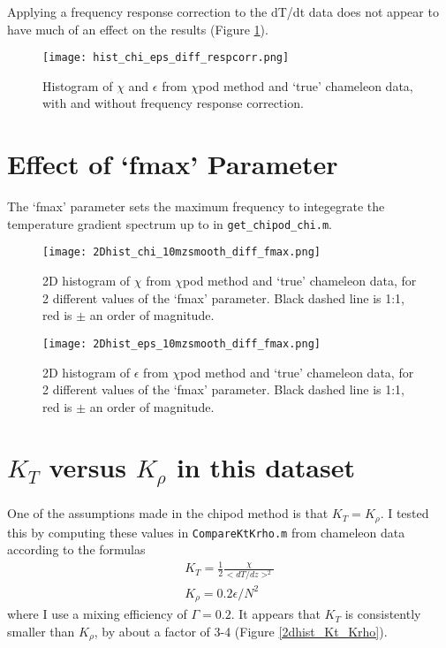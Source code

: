 \documentclass[11pt]{article}
\begin{document}
Applying a frequency response correction to the dT/dt data does not appear to have much of an effect on the results (Figure \ref{hist_dresp}).

\begin{figure}[htbp]
\texttt{[image: hist\_chi\_eps\_diff\_respcorr.png]}
\caption{Histogram of $\chi$ and $\epsilon$ from $\chi$pod method and `true' chameleon data, with and without frequency response correction.}
\label{hist_dresp}
\end{figure}






\clearpage
\newpage
\section{Effect of `fmax' Parameter}

The `fmax' parameter sets the maximum frequency to integegrate the temperature gradient spectrum up to in \verb+get_chipod_chi.m+.


\begin{figure}[htbp]
\texttt{[image: 2Dhist\_chi\_10mzsmooth\_diff\_fmax.png]}
\caption{2D histogram of $\chi$ from $\chi$pod method and `true' chameleon data, for 2 different values of the `fmax' parameter. Black dashed line is 1:1, red is $\pm$ an order of magnitude.}
\label{}
\end{figure}

\begin{figure}[htbp]
\texttt{[image: 2Dhist\_eps\_10mzsmooth\_diff\_fmax.png]}
\caption{2D histogram of $\epsilon$ from $\chi$pod method and `true' chameleon data, for 2 different values of the `fmax' parameter. Black dashed line is 1:1, red is $\pm$ an order of magnitude.}
\label{}
\end{figure}




\clearpage
\newpage
\section{$K_T$ versus $K_{\rho}$ in this dataset}

One of the assumptions made in the chipod method is that $K_T=K_{\rho}$. I tested this by computing these values in \verb+CompareKtKrho.m+ from chameleon data according to the formulas
\begin{eqnarray}
K_T=\frac{1}{2}\frac{\chi}{<dT/dz>^2} \\
K_{\rho}=0.2 \epsilon /N^2
\end{eqnarray}
where I use a mixing efficiency of $\Gamma=0.2$. It appears that $K_T$ is consistently smaller than $K_{\rho}$, by about a factor of 3-4 (Figure \ref{2dhist_Kt_Krho}).
\end{document}
